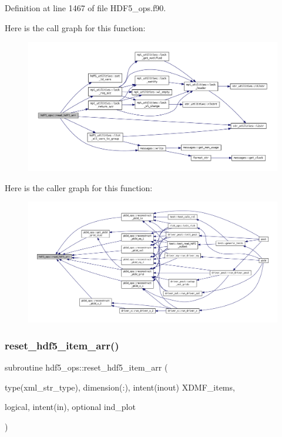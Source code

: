 Definition at line 1467 of file H\+D\+F5\+\_\+ops.\+f90.

Here is the call graph for this function\+:
\nopagebreak
\begin{figure}[H]
\begin{center}
\leavevmode
\includegraphics[width=350pt]{namespacehdf5__ops_a5108e0d6f6b492cb981505ebceedd9ee_cgraph}
\end{center}
\end{figure}
Here is the caller graph for this function\+:
\nopagebreak
\begin{figure}[H]
\begin{center}
\leavevmode
\includegraphics[width=350pt]{namespacehdf5__ops_a5108e0d6f6b492cb981505ebceedd9ee_icgraph}
\end{center}
\end{figure}
\mbox{\label{namespacehdf5__ops_aed5661fcfa44910873fc0f87bb6ed914}} 
\subsubsection{\texorpdfstring{reset\+\_\+hdf5\+\_\+item\+\_\+arr()}{reset\_hdf5\_item\_arr()}}
{\footnotesize\ttfamily subroutine hdf5\+\_\+ops\+::reset\+\_\+hdf5\+\_\+item\+\_\+arr (\begin{DoxyParamCaption}\item[{type(xml\+\_\+str\+\_\+type), dimension(\+:), intent(inout)}]{X\+D\+M\+F\+\_\+items,  }\item[{logical, intent(in), optional}]{ind\+\_\+plot }\end{DoxyParamCaption})}




